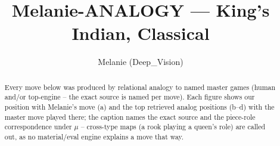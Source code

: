 \documentclass[11pt]{article}
\title{Melanie-ANALOGY — King's Indian, Classical}
\author{Melanie (Deep\_Vision)}
\date{}
\begin{document}
\maketitle

\begin{abstract}Every move below was produced by relational analogy to named master games (human and/or top-engine -- the exact source is named per move). Each figure shows our position with Melanie's move (a) and the top retrieved analog positions (b--d) with the master move played there; the caption names the exact source and the piece-role correspondence under $\mu$ -- cross-type maps (a rook playing a queen's role) are called out, as no material/eval engine explains a move that way.\end{abstract}

\begin{figure}[p]\centering
\begin{subfigure}{0.46\textwidth}\centering
\resizebox{\linewidth}{!}{%
\newchessgame
\chessboard[
  setfen={rnbq1rk1/ppp2pbp/3p1np1/4p3/2PPP3/2N2N2/PP2BPPP/R1BQK2R w KQ - 0 7},
  showmover=false,
  pgfstyle=straightmove, color=movearrow, markmove={d4-e5}
]}
\caption{}
\end{subfigure}\hfill
\begin{subfigure}{0.46\textwidth}\centering
\resizebox{\linewidth}{!}{%
\newchessgame
\chessboard[
  setfen={rnbq1rk1/ppp2pbp/3p1np1/4p3/2PPP3/2N2N2/PP2BPPP/R1BQK2R w KQ - 0 7},
  showmover=false,
  pgfstyle=straightmove, color=movearrow, markmove={e1-g1}
]}
\caption{}
\end{subfigure}
\\[4pt]
\begin{subfigure}{0.46\textwidth}\centering
\resizebox{\linewidth}{!}{%
\newchessgame
\chessboard[
  setfen={rnbq1rk1/ppp2pbp/3p1np1/4p3/2PPP3/2N2N2/PP2BPPP/R1BQK2R w KQ - 0 7},
  showmover=false,
  pgfstyle=straightmove, color=movearrow, markmove={e1-g1}
]}
\caption{}
\end{subfigure}\hfill
\begin{subfigure}{0.46\textwidth}\centering
\resizebox{\linewidth}{!}{%
\newchessgame
\chessboard[
  setfen={rnbq1rk1/ppp2pbp/3p1np1/4p3/2PPP3/2N2N2/PP2BPPP/R1BQK2R w KQ - 0 7},
  showmover=false,
  pgfstyle=straightmove, color=movearrow, markmove={e1-g1}
]}
\caption{}
\end{subfigure}

\end{figure}
\end{document}
